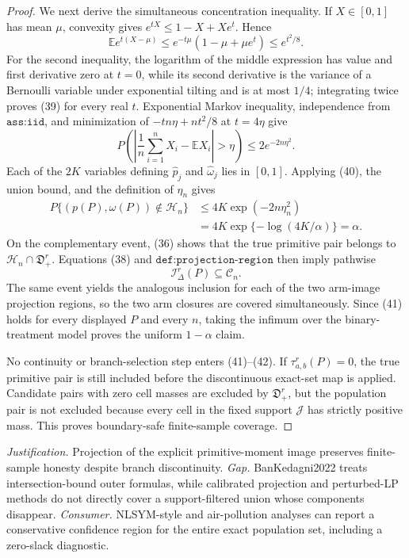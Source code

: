\documentclass{article}
\begin{document}
\begin{proof}
We next derive the simultaneous concentration inequality.  If \(X\in[0,1]\) has mean \(\mu\), convexity gives \(e^{tX}\le1-X+Xe^t\).  Hence
\[
 \mathbb E e^{t(X-\mu)}
 \le e^{-t\mu}(1-\mu+\mu e^t)
 \le e^{t^2/8}.                                                               \tag{39}
\]
For the second inequality, the logarithm of the middle expression has value and first derivative zero at \(t=0\), while its second derivative is the variance of a Bernoulli variable under exponential tilting and is at most \(1/4\); integrating twice proves (39) for every real \(t\).  Exponential Markov inequality, independence from \(\texttt{ass:iid}\), and minimization of \(-tn\eta+nt^2/8\) at \(t=4\eta\) give
\[
 P\!\left(\left|\frac1n\sum_{i=1}^nX_i-\mathbb EX_i\right|>\eta\right)
 \le2e^{-2n\eta^2}.                                                          \tag{40}
\]
Each of the \(2K\) variables defining \(\widehat p_j\) and \(\widehat\omega_j\) lies in \([0,1]\).  Applying (40), the union bound, and the definition of \(\eta_n\) gives
\[
 \begin{aligned}
 P\{(p(P),\omega(P))\notin\mathcal H_n\}
 &\le4K\exp(-2n\eta_n^2)\\
 &=4K\exp\{-\log(4K/\alpha)\}=\alpha.                                      \tag{41}
 \end{aligned}
\]
On the complementary event, (36) shows that the true primitive pair belongs to \(\mathcal H_n\cap\mathfrak D_+^r\).  Equations (38) and \(\texttt{def:projection-region}\) then imply pathwise
\[
 \mathcal I_\Delta^r(P)\subseteq\mathcal C_n.                                \tag{42}
\]
The same event yields the analogous inclusion for each of the two arm-image projection regions, so the two arm closures are covered simultaneously.  Since (41) holds for every displayed \(P\) and every \(n\), taking the infimum over the binary-treatment model proves the uniform \(1-\alpha\) claim.

No continuity or branch-selection step enters (41)--(42).  If \(\tau_{a,b}^r(P)=0\), the true primitive pair is still included before the discontinuous exact-set map is applied.  Candidate pairs with zero cell masses are excluded by \(\mathfrak D_+^r\), but the population pair is not excluded because every cell in the fixed support \(\mathcal J\) has strictly positive mass.  This proves boundary-safe finite-sample coverage.
\end{proof}
\par\smallskip\noindent \textit{Justification.} Projection of the explicit primitive-moment image preserves finite-sample honesty despite branch discontinuity. \textit{Gap.} BanKedagni2022 treats intersection-bound outer formulas, while calibrated projection and perturbed-LP methods do not directly cover a support-filtered union whose components disappear. \textit{Consumer.} NLSYM-style and air-pollution analyses can report a conservative confidence region for the entire exact population set, including a zero-slack diagnostic.
\end{document}
